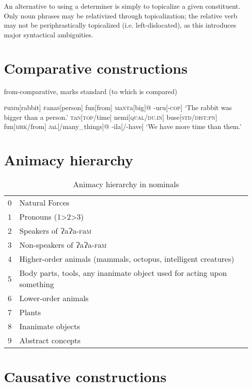 \documentclass[a4paper,10pt,twoside,openright]{memoir}
\newcommand{\lang}{ɁaɁa-\textsc{f}a\textsc{m}}
\newcommand{\famword}[5]{#1\textsc{#2}#3\textsc{#4}#5}
\begin{document}
An alternative to using a determiner is simply to topicalize a given constituent. Only noun phrases may be relativized through topicalization; the relative verb may not be periphrastically topicalized (i.e. left-dislocated), as this introduces major syntactical ambiguities.

\section{Comparative constructions}

from-comparative, marks standard (to which is compared)

\pex[interpartskip=3ex]
\a
\begingl
\famword{}{p}{u}{m}{u}[rabbit]
\famword{}{f}{ana}{s}{}[person]
fun[from]
\famword{}{m}{a}{nt}{a}[big]@
-uru[\textsc{-cop}]
\glft `The rabbit was bigger than a person.'
\endgl
\a
\begingl
\famword{}{t}{a}{n}{}[\textsc{top}/time]
nemi[\textsc{qual}/\textsc{du.in}]
buse[\textsc{std}/\textsc{dist:pn}]
fun[\textsc{mrk}/from]
\famword{}{j}{a}{l}{}[/many\_things]@
-ila[/-have]
\glft `We have more time than them.'
\endgl
\xe

\section{Animacy hierarchy}

\begin{table}[ht]
    \centering
    \begin{tabular}{ll}
    0 & Natural Forces \\
    1 & Pronouns (1>2>3) \\
    2 & Speakers of \lang{} \\
    3 & Non-speakers of \lang{} \\
    4 & Higher-order animals (mammals, octopus, intelligent creatures) \\
    5 & \parbox[t]{7cm}{Body parts, tools, any inanimate object used for acting upon something} \\
    6 & Lower-order animals \\
    7 & Plants \\
    8 & Inanimate objects \\
    9 & Abstract concepts 
    \end{tabular}
    \caption{Animacy hierarchy in nominals}
    \label{tab:hierarchy}
\end{table}

\section{Causative constructions}
\end{document}
